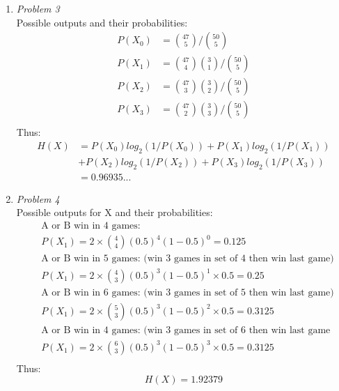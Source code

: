 \documentclass[12pt]{article}
\begin{document}
\begin{enumerate}
    \item\textit{Problem 3}\\
    Possible outputs and their probabilities:
    \begin{align*}
        P(X_0) &= {47 \choose 5} / {50 \choose 5} \\
        P(X_1) &= {47 \choose 4} {3 \choose 1} / {50 \choose 5}\\
        P(X_2) &= {47 \choose 3} {3 \choose 2} / {50 \choose 5}\\
        P(X_3) &= {47 \choose 2} {3 \choose 3} / {50 \choose 5}\\
    \end{align*}
    Thus:
    \begin{align*}
        H(X) &= P(X_0)log_2(1/P(X_0)) + P(X_1)log_2(1/P(X_1))\\
             &+ P(X_2)log_2(1/P(X_2)) + P(X_3)log_2(1/P(X_3))\\
             &= 0.96935...
    \end{align*}

    \item\textit{Problem 4}\\
    Possible outputs for X and their probabilities:\\
    \begin{align*}
        &\text{A or B win in 4 games:}\\
        &P(X_1) = 2 \times {4 \choose 4}(0.5)^4(1-0.5)^0 = 0.125\\
        &\text{A or B win in 5 games: (win 3 games in set of 4 then win last game)}\\
        &P(X_1) = 2 \times {4 \choose 3}(0.5)^3(1-0.5)^1 \times 0.5 = 0.25\\
        &\text{A or B win in 6 games: (win 3 games in set of 5 then win last game)}\\
        &P(X_1) = 2 \times {5 \choose 3}(0.5)^3(1-0.5)^2 \times 0.5 = 0.3125\\
        &\text{A or B win in 4 games: (win 3 games in set of 6 then win last game}\\
        &P(X_1) = 2 \times {6 \choose 3}(0.5)^3(1-0.5)^3 \times 0.5 = 0.3125\\
    \end{align*}
    Thus:
    \begin{equation*}
        H(X) = 1.92379
    \end{equation*}


\end{enumerate}
\end{document}
